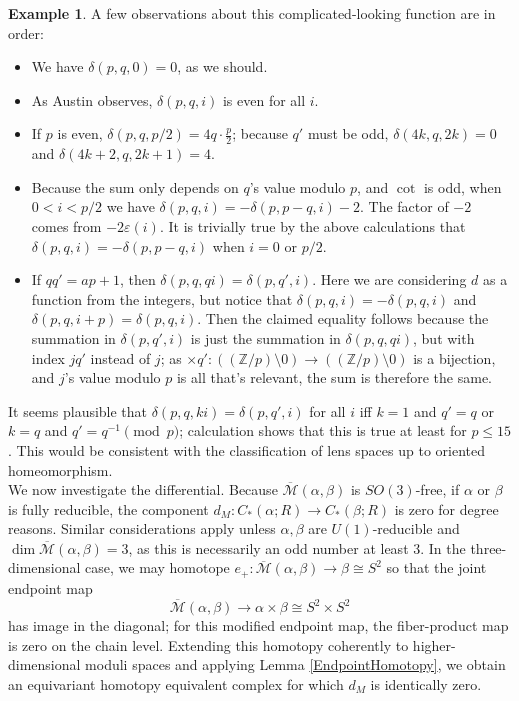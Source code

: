 \documentclass{memo-l}
\theoremstyle{definition}
\newtheorem{example}[theorem]{Example}
\theoremstyle{remark}
\numberwithin{section}{chapter}
\numberwithin{equation}{chapter}
\begin{document}
\begin{example}
A few observations about this complicated-looking function are in order: \begin{itemize}
\item We have $\delta(p,q,0) = 0$, as we should. \\
\item As Austin observes, $\delta(p,q,i)$ is even for all $i$.\\
\item If $p$ is even, $\delta(p,q,p/2) = 4q \cdot \frac{p}{2}$; because $q'$ must be odd, $\delta(4k, q, 2k) = 0$ and $\delta(4k+2, q, 2k+1) = 4$.\\
\item Because the sum only depends on $q$'s value modulo $p$, and $\cot$ is odd, when $0 < i < p/2$ we have $\delta(p,q,i) = - \delta(p,p-q,i) - 2$. The factor of $-2$ comes from $-2\varepsilon(i)$. It is trivially true by the above calculations that $\delta(p,q,i) = -\delta(p,p-q,i)$ when $i = 0$ or $p/2$.\\
\item If $qq' = ap + 1$, then $\delta(p, q, qi) = \delta(p, q', i).$ Here we are considering $d$ as a function from the integers, but notice that $\delta(p,q,i) = -\delta(p,q,i)$ and $\delta(p,q,i+p) = \delta(p,q,i)$. Then the claimed equality follows because the summation in $\delta(p,q',i)$ is just the summation in $\delta(p,q,qi)$, but with index $jq'$ instead of $j$; as $\times q': \left((\mathbb Z/p) \setminus 0\right) \to \left((\mathbb Z/p) \setminus 0\right)$ is a bijection, and $j$'s value modulo $p$ is all that's relevant, the sum is therefore the same.
\end{itemize}

It seems plausible that $\delta(p,q,ki) = \delta(p,q',i)$ for all $i$ iff $k = 1$ and $q' = q$ or $k = q$ and $q' = q^{-1} \pmod p$; calculation shows that this is true at least for $p \leq 15$. This would be consistent with the classification of lens spaces up to oriented homeomorphism.\\

We now investigate the differential. Because $\overline{\mathcal M}(\alpha, \beta)$ is $SO(3)$-free, if $\alpha$ or $\beta$ is fully reducible, the component $d_M: C_*(\alpha; R) \to C_*(\beta; R)$ is zero for degree reasons. Similar considerations apply unless $\alpha, \beta$ are $U(1)$-reducible and $\dim\overline{\mathcal M}(\alpha, \beta) = 3$, as this is necessarily an odd number at least $3$. In the three-dimensional case, we may homotope $e_+: \overline{\mathcal M}(\alpha, \beta) \to \beta \cong S^2$ so that the joint endpoint map \[\overline{\mathcal M}(\alpha, \beta) \to \alpha \times \beta \cong S^2 \times S^2\] has image in the diagonal; for this modified endpoint map, the fiber-product map is zero on the chain level. Extending this homotopy coherently to higher-dimensional moduli spaces and applying Lemma \ref{EndpointHomotopy}, we obtain an equivariant homotopy equivalent complex for which $d_M$ is identically zero.


\end{example}
\end{document}
